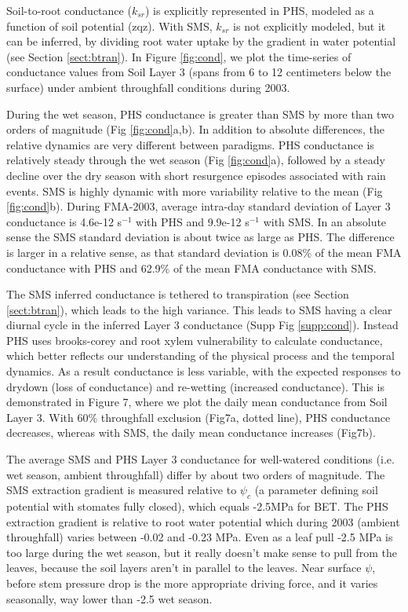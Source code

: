 \documentclass[draft,linenumbers]{agujournal}
\begin{document}
Soil-to-root conductance ($k_{sr}$) is explicitly represented in PHS, modeled as a function of soil potential (zqz).
With SMS, $k_{sr}$ is not explicitly modeled, but it can be inferred, by dividing root water uptake by the gradient in water potential (see Section \ref{sect:btran}).
In Figure \ref{fig:cond}, we plot the time-series of conductance values from Soil Layer 3 (spans from 6 to 12 centimeters below the surface) under ambient throughfall conditions during 2003.

During the wet season, PHS conductance is greater than SMS by more than two orders of magnitude (Fig \ref{fig:cond}a,b).
In addition to absolute differences, the relative dynamics are very different between paradigms.
PHS conductance is relatively steady through the wet season (Fig \ref{fig:cond}a), followed by 
a steady decline over the dry season with short resurgence episodes associated with rain events.
SMS is highly dynamic with more variability relative to the mean (Fig \ref{fig:cond}b).
During FMA-2003, average intra-day standard deviation of Layer 3 conductance is 4.6e-12 s$^{-1}$ with PHS and 9.9e-12 s$^{-1}$ with SMS. 
In an absolute sense the SMS standard deviation is about twice as large as PHS.
The difference is larger in a relative sense, as that standard deviation is 0.08\% of the mean FMA conductance with PHS
and 62.9\% of the mean FMA conductance with SMS.

The SMS inferred conductance is tethered to transpiration (see Section \ref{sect:btran}), which leads to the high variance.
This leads to SMS having a clear diurnal cycle in the inferred Layer 3 conductance (Supp Fig \ref{supp:cond}). 
Instead PHS uses brooks-corey and root xylem vulnerability to calculate conductance, which better reflects our understanding of the physical process and the temporal dynamics.
As a result conductance is less variable, with the expected responses to drydown (loss of conductance) and re-wetting (increased conductance).
This is demonstrated in Figure 7, where we plot the daily mean conductance from Soil Layer 3.
With 60\% throughfall exclusion (Fig7a, dotted line), PHS conductance decreases, whereas with SMS, the daily mean conductance increases (Fig7b).

The average SMS and PHS Layer 3 conductance for well-watered conditions (i.e. wet season, ambient throughfall) differ by about two orders of magnitude.
The SMS extraction gradient is measured relative to $\psi_c$ (a parameter defining soil potential with stomates fully closed), which equals -2.5MPa for BET.
The PHS extraction gradient is relative to root water potential which during 2003 (ambient throughfall) varies between -0.02 and -0.23 MPa.
Even as a leaf pull -2.5 MPa is too large during the wet season, but it really doesn't make sense to pull from the leaves, because the soil layers aren't in parallel to the leaves. 
Near surface $\psi$, before stem pressure drop is the more appropriate driving force, and it varies seasonally, way lower than -2.5 wet season.
\end{document}
